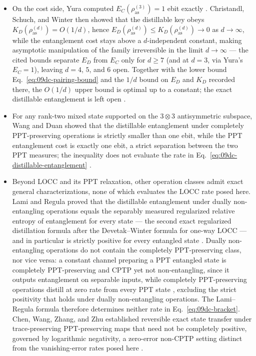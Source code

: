 \begin{itemize}
  \item On the cost side, Yura computed $E_C(\rho_{\mathrm{as}}^{(3)})=1$ ebit
  exactly .  Christandl, Schuch, and Winter
  then showed that the distillable key obeys
  $K_D(\rho_{\mathrm{as}}^{(d)})=O(1/d)$, hence
  $E_D(\rho_{\mathrm{as}}^{(d)})\le K_D(\rho_{\mathrm{as}}^{(d)})\to0$ as
  $d\to\infty$, while the entanglement cost stays above a $d$-independent
  constant, making asymptotic manipulation of the family irreversible in
  the limit $d\to\infty$ --- the cited bounds separate $E_D$ from $E_C$
  only for $d\ge7$ (and at $d=3$, via Yura's $E_C=1$), leaving $d=4$,
  $5$, and $6$ open.  Together with the lower bound
  Eq.~\eqref{eq:09dc-pairing-bound} and the $1/d$ bound on $E_D$ and
  $K_D$ recorded there, the $O(1/d)$ upper bound is optimal up to a
  constant; the exact distillable entanglement is left open
  .

  \item For any rank-two mixed state supported on the $3\otimes3$ antisymmetric
  subspace, Wang and Duan showed that the distillable entanglement under
  completely PPT-preserving operations is strictly smaller than one ebit,
  while the PPT entanglement cost is exactly one ebit, a strict separation
  between the two PPT measures; the inequality does not evaluate the rate in
  Eq.~\eqref{eq:09dc-distillable-entanglement}
  .

  \item Beyond LOCC and its PPT relaxation, other operation classes admit
  exact general characterizations, none of which evaluates the LOCC rate
  posed here.  Lami and Regula proved that the distillable entanglement
  under dually non-entangling operations equals the separably measured
  regularized relative entropy of entanglement for every state --- the
  second exact regularized distillation formula after the Devetak--Winter
  formula for one-way LOCC --- and in particular is strictly positive for
  every entangled state .  Dually
  non-entangling operations do not contain the completely PPT-preserving
  class, nor vice versa: a constant channel preparing a PPT entangled state
  is completely PPT-preserving and CPTP yet not non-entangling, since it
  outputs entanglement on separable inputs, while completely PPT-preserving
  operations distill at zero rate from every PPT state
  , excluding the strict positivity that
  holds under dually non-entangling operations.  The Lami--Regula formula
  therefore determines neither rate in Eq.~\eqref{eq:09dc-bracket}.  Chen,
  Wang, Zhang, and Zhu established reversible exact state transfer under
  trace-preserving PPT-preserving maps that need not be completely
  positive, governed by logarithmic negativity, a zero-error non-CPTP
  setting distinct from the vanishing-error rates posed here
  .


\end{itemize}
